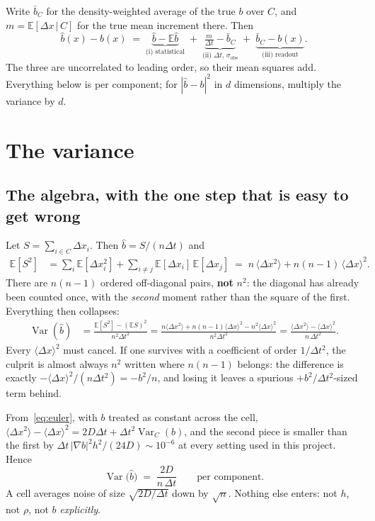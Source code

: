 \documentclass[11pt,a4paper]{article}
\newcommand{\dx}{\Delta x}
\newcommand{\dt}{\Delta t}
\newcommand{\E}{\mathbb{E}}
\begin{document}
Write $\bar b_C$ for the density-weighted average of the true $b$ over $C$, and
$m=\E[\dx\,|\,C]$ for the true mean increment there. Then
\begin{equation}
  \hat b(x)-b(x)
  \;=\;\underbrace{\hat b-\E\hat b}_{\text{(i) statistical}}
  \;+\;\underbrace{\tfrac{m}{\dt}-\bar b_C}_{\text{(ii) }\dt\text{, }\sigma_{\mathrm{obs}}}
  \;+\;\underbrace{\bar b_C-b(x)}_{\text{(iii) readout}} .
  \label{eq:split}
\end{equation}
The three are uncorrelated to leading order, so their mean squares add. Everything
below is per component; for $|\hat b-b|^2$ in $d$ dimensions, multiply the variance
by $d$.

\section{The variance}

\subsection{The algebra, with the one step that is easy to get wrong}

Let $S=\sum_{i\in C}\dx_i$. Then $\hat b = S/(n\dt)$ and
\begin{align}
  \E[S^{2}] &= \sum_{i}\E[\dx_i^{2}] + \sum_{i\neq j}\E[\dx_i]\,\E[\dx_j]
   \;=\; n\,\langle \dx^{2}\rangle + n(n-1)\,\langle \dx\rangle^{2} .
  \label{eq:square}
\end{align}
There are $n(n-1)$ ordered off-diagonal pairs, \textbf{not} $n^{2}$: the diagonal has
already been counted once, with the \emph{second} moment rather than the square of the
first. Everything then collapses:
\begin{align}
  \operatorname{Var}(\hat b)
  &= \frac{\E[S^{2}]-(\E S)^{2}}{n^{2}\dt^{2}}
   = \frac{n\langle \dx^{2}\rangle + n(n-1)\langle \dx\rangle^{2}
           - n^{2}\langle \dx\rangle^{2}}{n^{2}\dt^{2}}
   = \frac{\langle \dx^{2}\rangle-\langle \dx\rangle^{2}}{n\,\dt^{2}} .
  \label{eq:varmean}
\end{align}
Every $\langle\dx\rangle^{2}$ must cancel. If one survives with a coefficient of order
$1/\dt^{2}$, the culprit is almost always $n^{2}$ written where $n(n-1)$ belongs: the
difference is exactly $-\langle\dx\rangle^{2}/(n\dt^{2}) = -b^{2}/n$, and losing it
leaves a spurious $+b^{2}/\dt^{2}$-sized term behind.

From~\eqref{eq:euler}, with $b$ treated as constant across the cell,
$\langle \dx^{2}\rangle - \langle\dx\rangle^{2} = 2D\dt + \dt^{2}\operatorname{Var}_C(b)$,
and the second piece is smaller than the first by
$\dt\,|\nabla b|^{2}h^{2}/(24D)\sim10^{-6}$ at every setting used in this project.
Hence
\begin{equation}\boxed{
  \operatorname{Var}\big(\hat b\big) \;=\; \frac{2D}{n\,\dt}\qquad\text{per component.}
  \label{eq:var}
}\end{equation}
A cell averages noise of size $\sqrt{2D/\dt}$ down by $\sqrt n$. Nothing else enters:
not $h$, not $\rho$, not $b$ \textemdash{} \emph{explicitly}.
\end{document}
